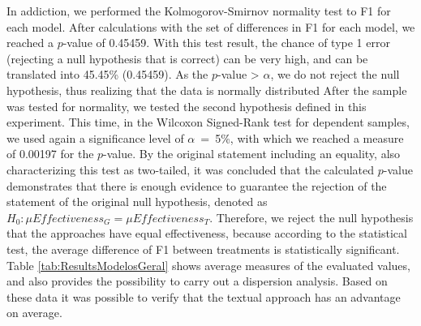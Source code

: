 In addiction, we performed the Kolmogorov-Smirnov normality test to F1 for each model. 
After calculations with the set of differences in F1 for each model, we reached a $p$-value of 0.45459.
With this test result, the chance of type 1 error (rejecting a null hypothesis that is correct) can be very high, and can be translated into 45.45\% (0.45459).
As the $p$-value > $\alpha$, we do not reject the null hypothesis, thus realizing that the data is normally distributed
After the sample was tested for normality, we tested the second hypothesis defined in this experiment.
This time, in the Wilcoxon Signed-Rank test for dependent samples, we used again a significance level of $\alpha$~=~5\%, with which we reached a measure of 0.00197 for the $p$-value.
By the original statement including an equality, also characterizing this test as two-tailed, it was concluded that the calculated $p$-value demonstrates that there is enough evidence to guarantee the rejection of the statement of the original null hypothesis, denoted as $H_0: \mu Effectiveness_G = \mu Effectiveness_T$.
Therefore, we reject the null hypothesis that the approaches have equal effectiveness, because according to the statistical test, the average difference of F1 between treatments is statistically significant.
Table \ref{tab:ResultsModelosGeral} shows average measures of the evaluated values, and also provides the possibility to carry out a dispersion analysis.
Based on these data it was possible to verify that the textual approach has an advantage on average.

